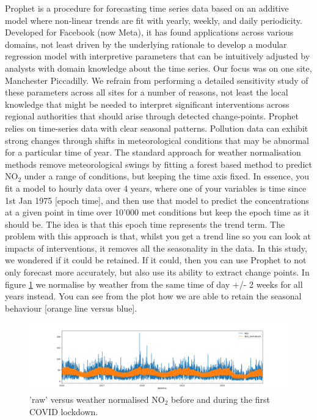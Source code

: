\documentclass{article}
\begin{document}
\noindent Prophet is a procedure for forecasting time series data based on an additive model where non-linear trends are fit with yearly, weekly, and daily periodicity. Developed for Facebook (now Meta), it has found applications across various domains, not least driven by the underlying rationale to develop a modular regression model with interpretive parameters that can be intuitively adjusted by analysts with domain knowledge about the time series. Our focus was on one site, Manchester Piccadilly. We refrain from performing a detailed sensitivity study of these parameters across all sites for a number of reasons, not least the local knowledge that might be needed to interpret significant interventions across regional authorities that should arise through detected change-points. Prophet relies on time-series data with clear seasonal patterns. Pollution data can exhibit strong changes through shifts in meteorological conditions that may be abnormal for a particular time of year. The standard approach for weather normalisation methods remove meteorological swings by fitting a forest based method to predict NO$_{2}$ under a range of conditions, but keeping the time axis fixed. In essence, you fit a model to hourly data over 4 years, where one of your variables is time since 1st Jan 1975 [epoch time], and then use that model to predict the concentrations at a given point in time over 10'000 met conditions but keep the epoch time as it should be. The idea is that this epoch time represents the trend term. The problem with this approach is that, whilst you get a trend line so you can look at impacts of interventions, it removes all the seasonality in the data.  In this study, we wondered  if it could be retained. If it could, then you can use Prophet to not only forecast more accurately, but also use its ability to extract change points. In figure \ref{fig::NO2normalised} we normalise by weather from the same time of day +/- 2 weeks for all years instead. You can see from the plot how we are able to retain the seasonal behaviour [orange line versus blue].\\


\begin{figure}
	\centering
	\includegraphics[width=0.95\linewidth]{Figures/NO2_raw_v_weathernorm.png}		
	\caption{'raw' versus weather normalised NO$_{2}$ before and during the first COVID lockdown. } \label{fig::NO2normalised}
\end{figure}
\end{document}
